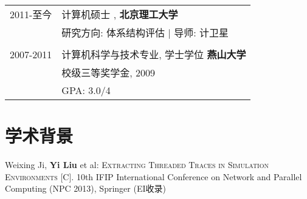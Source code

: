 \documentclass[a4paper,10pt]{article} %
\begin{document}
\begin{tabular}{rl}	

\textsc{2011-至今} & 计算机硕士 , \textbf{北京理工大学} \\
&研究方向: 体系结构评估 | \small 导师: 计卫星\\

&\\


\textsc{2007-2011} & 计算机科学与技术专业, 学士学位 \textbf{燕山大学}\\
& 校级三等奖学金, 2009 \\
& \textsc{GPA}: 3.0/4 \\
\end{tabular}

\section{学术背景}
Weixing Ji, \textbf{Yi Liu} et al: \textsc{Extracting Threaded Traces in Simulation Environments [C].}  10th IFIP International Conference on Network and Parallel Computing (NPC 2013), Springer (EI收录)

\nopagebreak
\end{document}
